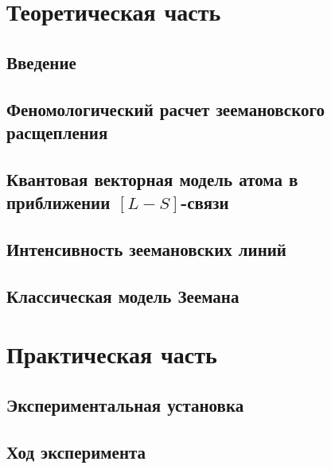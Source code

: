 



\def\labauthors{}
\def\labgroup{430}
\def\labnumber{2}
\def\labtheme{Эффект Зеемана}
\renewcommand{\vec}{\mathbf}
\renewcommand{\Re}{\operatorname{Re}}
\renewcommand{\Im}{\operatorname{Im}}
\renewcommand{\phi}{\varphi}
\renewcommand{\hat}{\widehat}



\tableofcontents
\newpage
\section{Теоретическая часть}
\subsection{Введение}
% 
\subsection{Феномологический расчет зеемановского расщепления}
% 
\subsection{Квантовая векторная модель атома в приближении $[L-S]$-связи}
% 
\subsection{Интенсивность зеемановских линий}
% 
\subsection{Классическая модель Зеемана}




\section{Практическая часть}
\subsection{Экспериментальная установка}

\subsection{Ход эксперимента}


